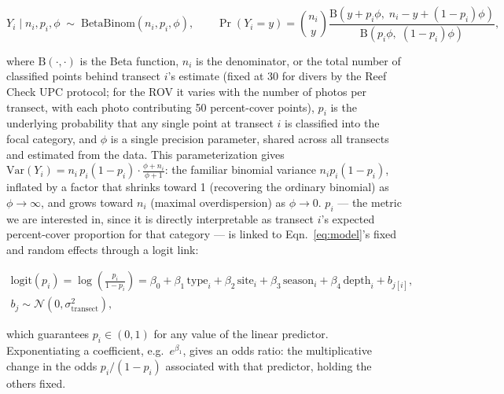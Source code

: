 \documentclass[11pt]{article}
\begin{document}
\begin{equation}
Y_i \mid n_i, p_i, \phi
\;\sim\;
\mathrm{BetaBinom}(n_i, p_i, \phi),
\qquad
\Pr(Y_i = y)
=
\binom{n_i}{y}
\frac{\mathrm{B}\!\left(y + p_i \phi,\; n_i - y + (1-p_i)\phi\right)}
{\mathrm{B}\!\left(p_i \phi,\; (1-p_i)\phi\right)},
\label{eq:betabinom}
\end{equation}

\noindent
where $\mathrm{B}(\cdot,\cdot)$ is the Beta function, $n_i$ is the denominator, 
or the total number of classified points behind transect $i$'s estimate (fixed 
at 30 for divers by the Reef Check UPC protocol; for the ROV it varies with the 
number of photos per transect, with each photo contributing 50 percent-cover 
points), $p_i$ is the underlying probability that any single point at 
transect $i$ is classified into the focal category, and $\phi$ is a 
single precision parameter, shared across all transects and estimated 
from the data. 
This parameterization gives 
$\mathrm{Var}(Y_i) = n_i\, p_i (1-p_i) \cdot \frac{\phi + n_i}{\phi + 1}$: 
the familiar binomial variance $n_i p_i(1-p_i)$, inflated by a factor that 
shrinks toward 1 (recovering the ordinary binomial) as $\phi \to \infty$, 
and grows toward $n_i$ (maximal overdispersion) as $\phi \to 0$. 
%
$p_i$ --- the metric we are interested in, since it is 
directly interpretable as transect $i$'s expected percent-cover proportion 
for that category --- is linked to Eqn.~\ref{eq:model}'s fixed and 
random effects through a logit link:

\begin{equation}
\begin{gathered}
\mathrm{logit}(p_i)
=
\log\!\left( \frac{p_i}{1-p_i} \right)
=
\beta_0 
+ \beta_1\, \mathrm{type}_i 
+ \beta_2\, \mathrm{site}_i 
+ \beta_3\, \mathrm{season}_i 
+ \beta_4\, \mathrm{depth}_i 
+ b_{j[i]},
\\
b_{j} \sim \mathcal{N}(0, \sigma^2_{\mathrm{transect}}),
\end{gathered}
\label{eq:betabinom-link}
\end{equation}

\noindent
which guarantees $p_i \in (0,1)$ for any value of the linear predictor.
Exponentiating a coefficient, e.g.\ $e^{\beta_1}$, gives an odds ratio:
the multiplicative change in the odds $p_i/(1-p_i)$ associated with that
predictor, holding the others fixed.
\end{document}
